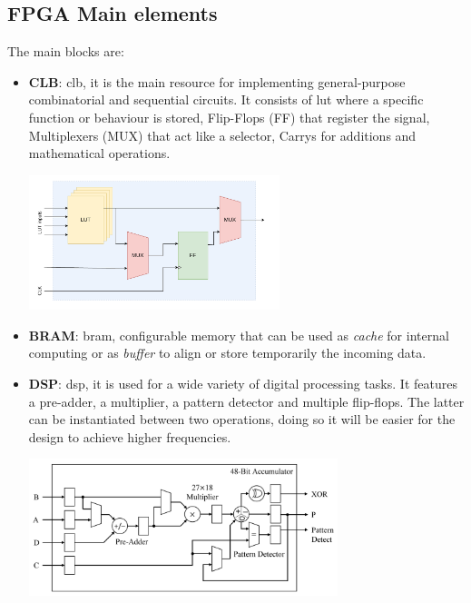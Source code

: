 \documentclass[../../main.tex]{subfiles}
\begin{document}
\subsection{FPGA Main elements}
\label{sec:FPGA_elements}
The main blocks are:
\begin{itemize}
    \item \textbf{CLB}: \acrlong{clb}, it is the main resource for implementing general-purpose combinatorial and sequential circuits. It consists of \acrfull{lut} where a specific function or behaviour is stored, Flip-Flops (FF) that register the signal, Multiplexers (MUX) that act like a selector, Carrys for additions and mathematical operations.  
    
    \begin{minipage}{\linewidth}
        \centering
        \includegraphics[width=7.3cm]{sections/04/Images/FPGA_CLB.pdf}
    \end{minipage}
    \item \textbf{BRAM}: \acrlong{bram}, configurable memory that can be used as \textit{cache} for internal computing or as \textit{buffer} to align or store temporarily the incoming data.
    \item \textbf{DSP}: \acrlong{dsp}, it is used for a wide variety of digital processing tasks. It features a pre-adder, a multiplier, a pattern detector and multiple flip-flops. The latter can be instantiated between two operations, doing so it will be easier for the design to achieve higher frequencies.  
    \begin{minipage}{\linewidth}
        \centering
        \includegraphics[width=9cm]{sections/04/Images/DSP48E2.png}

\end{minipage}
\end{itemize}
\end{document}
